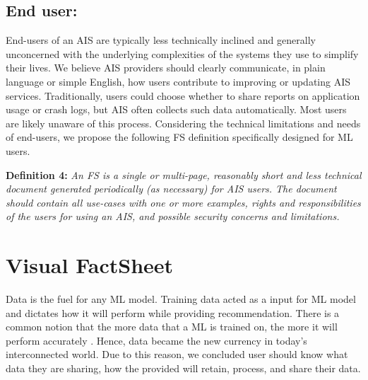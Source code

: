 \documentclass[manuscript,screen,review]{acmart}
\begin{document}
\subsection{End user:}

	
	End-users of an AIS are typically less technically inclined and generally unconcerned with the underlying complexities of the systems they use to simplify their lives. We believe AIS providers should clearly communicate, in plain language or simple English, how users contribute to improving or updating AIS services. Traditionally, users could choose whether to share reports on application usage or crash logs, but AIS often collects such data automatically. Most users are likely unaware of this process. Considering the technical limitations and needs of end-users, we propose the following FS definition specifically designed for ML users.

	\textbf{Definition 4: }\textit{An FS is a single or multi-page, reasonably short and less technical document generated periodically (as necessary) for AIS users. The document should contain all use-cases with one or more examples, rights and responsibilities of the users for using an AIS, and possible security concerns and limitations.}

\section{Visual FactSheet}

	Data is the fuel for any ML model. Training data acted as a input for ML model and dictates how it will perform while providing recommendation. There is a common notion that the more data that a ML is trained on, the more it will perform accurately \cite{nield2022essential}. Hence, data became the new currency in today's interconnected world\cite{Gates:2014:DNC:2683467.2683477}. Due to this reason, we concluded user should know what data they are sharing, how the provided will retain, process, and share their data.
	
\end{document}
